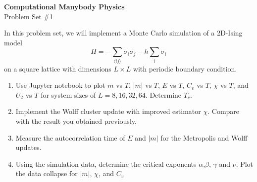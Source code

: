 \documentclass[12pt]{article}
\begin{document}
\begin{center}
\Large
\textbf{Computational Manybody Physics}\\
\large
Problem Set \#1


\end{center}
In this problem set, we will implement a Monte Carlo simulation of a 2D-Ising model
\[
H=-\sum_{\langle ij\rangle} \sigma_i \sigma_j - h \sum_{i} \sigma_i
\]
on a square lattice with dimensions $L\times L$ with periodic boundary condition. 
\begin{enumerate} 
\item Use Jupyter notebook to plot $m$ vs $T$, $|m|$ vs $T$, $E$ vs $T$, $C_v$ vs $T$, $\chi$ vs $T$, and $U_2$ vs $T$  for system sizes of $L=8, 16, 32, 64$. Determine $T_c$.  
\item Implement the Wolff cluster update with improved estimator $\chi$. Compare with the result you obtained previously.
\item  Measure the autocorrelation time of $E$ and $|m|$ for the Metropolis and Wolff updates.
\item Using the simulation data, determine the critical exponents $\alpha$,$\beta$,  $\gamma$ and $\nu$. Plot the data collapse for $|m|$, $\chi$, and $C_v$
\end{enumerate}
\end{document}
